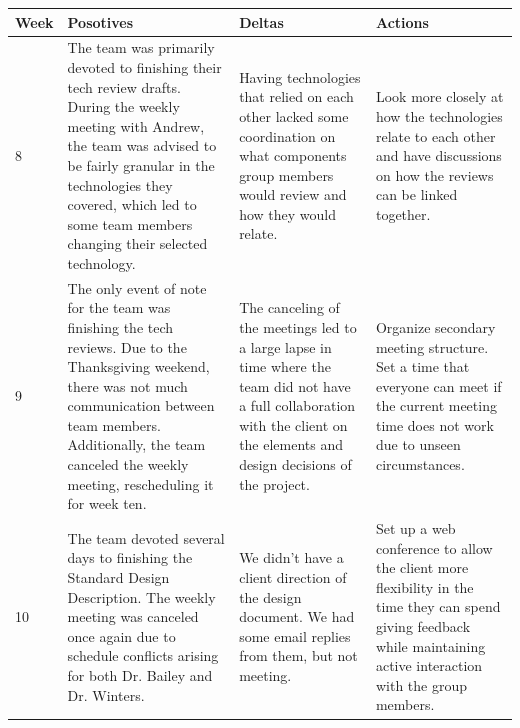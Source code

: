 \documentclass[onecolumn, draftclsnofoot,10pt, compsoc]{IEEEtran}
\begin{document}
\begin{center}
\begin{tabular}{ | m{1cm} |m{5cm} | m{5cm}| m{5cm} | }
	\end{tabular}

	\begin{tabular}{ | m{1cm} |m{5cm} | m{5cm}| m{5cm} | } 
	\hline
	Week & Posotives & Deltas & Actions \\ 
	\hline

	8 &
	The team was primarily devoted to finishing their tech review drafts. During the weekly meeting with Andrew, the team was advised to be fairly granular in the technologies they covered, which led to some team members changing their selected technology. &
	Having technologies that relied on each other lacked some coordination on what components group members would review and how they would relate.&
	Look more closely at how the technologies relate to each other and have discussions on how the reviews can be linked together. \\
	\hline
	
	9 &
	The only event of note for the team was finishing the tech reviews. Due to the Thanksgiving weekend, there was not much communication between team members. Additionally, the team canceled the weekly meeting, rescheduling it for week ten.&
	The canceling of the meetings led to a large lapse in time where the team did not have a full collaboration with the client on the elements and design decisions of the project.&
	Organize secondary meeting structure. Set a time that everyone can meet if the current meeting time does not work due to unseen circumstances. \\
	\hline
	
	10 &
	The team devoted several days to finishing the Standard Design Description. The weekly meeting was canceled once again due to schedule conflicts arising for both Dr. Bailey and Dr. Winters.&
	We didn't have a client direction of the design document. We had some email replies from them, but not meeting. 
	&Set up a web conference to allow the client more flexibility in the time they can spend giving feedback while maintaining active interaction with the group members. \\
	\hline

	\end{tabular}
\end{center}
\end{document}
